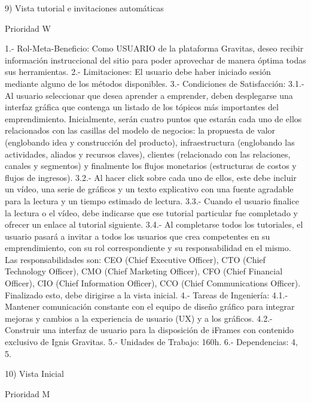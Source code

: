 9) Vista tutorial e invitaciones automáticas

	Prioridad W

	1.-	Rol-Meta-Beneficio: Como USUARIO de la plataforma Gravitas, deseo recibir información instruccional del sitio para poder aprovechar de manera óptima todas sus herramientas.
	2.-	Limitaciones: El usuario debe haber iniciado sesión mediante alguno de los métodos disponibles.
	3.-	Condiciones de Satisfacción:
		3.1.- Al usuario seleccionar que desea aprender a emprender, deben desplegarse una interfaz gráfica que contenga un listado de los tópicos más importantes del emprendimiento.  Inicialmente, serán cuatro puntos que estarán cada uno de ellos relacionados con las casillas del modelo de negocios: la propuesta de valor (englobando idea y construcción del producto), infraestructura (englobando las actividades, aliados y recursos claves), clientes (relacionado con las relaciones, canales y segmentos) y finalmente los flujos monetarios (estructuras de costos y flujos de ingresos).
		3.2.- Al hacer click sobre cada uno de ellos, este debe incluir un vídeo, una serie de gráficos y un texto explicativo con una fuente agradable para la lectura y un tiempo estimado de lectura.
		3.3.-	Cuando el usuario finalice la lectura o el vídeo, debe indicarse que ese tutorial particular fue completado y ofrecer un enlace al tutorial siguiente.
		3.4.-	Al completarse todos los tutoriales, el usuario pasará a invitar a todos los usuarios que crea competentes en su emprendimiento, con su rol correspondiente y su responsabilidad en el mismo. Las responsabilidades son: CEO (Chief Executive Officer), CTO (Chief Technology Officer), CMO (Chief Marketing Officer), CFO (Chief Financial Officer), CIO (Chief Information Officer), CCO (Chief Communications Officer). Finalizado esto, debe dirigirse a la vista inicial.
	4.-	Tareas de Ingeniería:
		4.1.- Mantener comunicación constante con el equipo de diseño gráfico para integrar mejoras y cambios a la experiencia de usuario (UX) y a los gráficos.
		4.2.- Construir una interfaz de usuario para la disposición de iFrames  con contenido exclusivo de Ignis Gravitas.
	5.-	Unidades de Trabajo:  160h.
	6.-	Dependencias: 4, 5.

10) Vista Inicial

	Prioridad M

